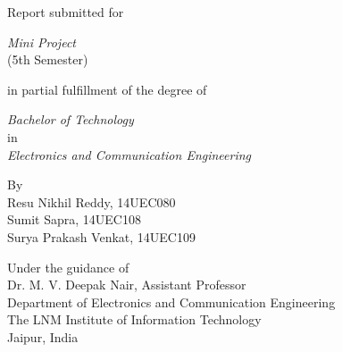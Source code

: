 \begin{titlepage}
\begin{tabular}{@{}p{\textwidth}@{}}
  \end{tabular}
      \vspace{1.1cm}
      \begin{center}
      	\Large{
      		Report submitted for
      	}
      	\end{center}
      	\vspace{0.3 cm}
      	\begin{center}
      	{
      		\LARGE \textit{Mini Project}\\
      		\large (5th Semester)
      	}
      \end{center}
        \vspace{0.35 cm}
      \begin{center}
      	{
      	\Large
      	 in partial fulfillment of the degree of
      	}
      	\end{center}
      	\vspace{0.3 cm}
      	\begin{center}
      		{\textsl{
      	\Large Bachelor of Technology} \\ \vspace{0.2 cm}
      	\large in \\ \vspace{0.2 cm}\textsl{
      	\Large Electronics and Communication Engineering}
      	}
      \end{center}
  \vspace{0.5 cm}
  \begin{center}
    {\large
      By
    }\\
    \vspace{0.2cm}
    {\large
      Resu Nikhil Reddy, 14UEC080\\
      Sumit Sapra, 14UEC108\\
      Surya Prakash Venkat, 14UEC109
    }
\end{center}
  \vfill
 \begin{center}
 	{\large
      Under the guidance of\\
      \vspace{0.2cm}
      Dr. M. V. Deepak Nair, Assistant Professor\\
      Department of Electronics and Communication Engineering\\
      The LNM Institute of Information Technology\\
      Jaipur, India
    }
  \end{center}
\end{titlepage}
\clearpage
